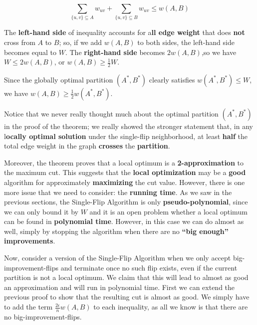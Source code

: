 $$
\sum_{\{u,v\} \subseteq A} w_{uv} + \sum_{\{u,v\} \subseteq B} w_{uv} \leq  w(A, B)
$$

The \textbf{left-hand side} of inequality accounts for a\textbf{ll edge weight} that does \textbf{not} cross from $A$ to $B$; so, if we add $w(A, B)$ to both sides, the left-hand side becomes equal to $W$. The \textbf{right-hand side} becomes $2w(A, B)$,so we have $W \leq 2w(A, B)$, or $w(A, B) \geq \frac{1}{2} W$. 

Since the globally optimal partition $(A^*, B^*)$ clearly satisfies $w(A^*, B^*) \leq W$, we have $w(A, B) \geq \frac{1}{2} w(A^*, B^*)$.

Notice that we never really thought much about the optimal partition $(A^*, B^*)$ in the proof of the theorem; we really showed the stronger statement that, in any l\textbf{ocally optimal solution} under the single-flip neighborhood, at least \textbf{half} the total edge weight in the graph \textbf{crosses} the \textbf{partition}. 

Moreover, the theorem proves that a local optimum is a \textbf{2-approximation} to the maximum cut. This suggests that the \textbf{local optimization} may be a \textbf{good} algorithm for approximately \textbf{maximizing} the cut value. However, there is one more issue that we need to consider: the \textbf{running time}. As we saw in the previous sections, the Single-Flip Algorithm is only \textbf{pseudo-polynomial}, since we can only bound it by $W$ and it is an open problem whether a local optimum can be found in \textbf{polynomial time}. However, in this case we can do almost as well, simply by stopping the algorithm when there are no \textbf{“big enough” improvements}. 


Now, consider a version of the Single-Flip Algorithm when we only accept big-improvement-flips and terminate once no such flip exists, even if the current partition is not a local optimum. We claim that this will lead to almost as good an approximation and will run in polynomial time. First we can extend the previous proof to show that the resulting cut is almost as good. We simply have to add the term $\frac{2 \epsilon}{n} w(A, B)$ to each inequality, as all we know is that there are no big-improvement-flips.

